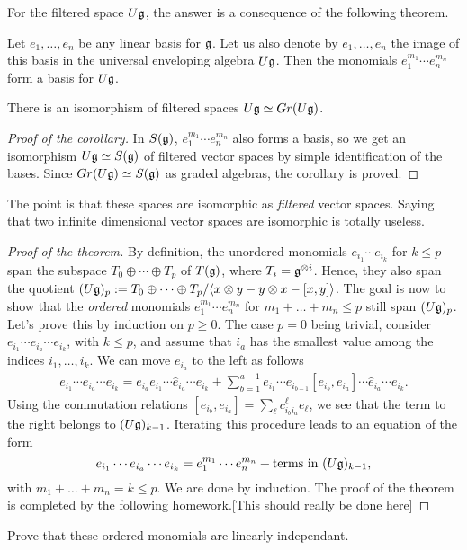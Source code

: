  For the filtered space $U\mathfrak{g}$, the answer is a consequence of the following theorem.
 \begin{theorem} 
   Let $e_1,\dots, e_n$ be any linear basis for $\mathfrak{g}$. Let us also denote by
   $e_1,\dots, e_n$ the image of this basis in the universal enveloping algebra $U\mathfrak{g}$.
   Then the monomials $e_1^{m_1}\cdots e_n^{m_n}$ form a basis for $U\mathfrak{g}$.
 \end{theorem}
 \begin{corollary}
 There is an isomorphism of filtered spaces $U\mathfrak{g}\simeq Gr(U\mathfrak{g})$.
 \end{corollary}
 \begin{proof}[Proof of the corollary]

In $S(\mathfrak{g})$, $e_1^{m_1}\cdots e_n^{m_n}$ also forms a basis, so we get an isomorphism
$U\mathfrak{g}\simeq S(\mathfrak{g})$ of filtered vector spaces by simple identification of the bases.
Since $Gr(U\mathfrak{g})\simeq S(\mathfrak{g})$ as graded algebras, the corollary is proved.
 \end{proof}
 \begin{remark}
 The point is that these spaces are isomorphic as {\em filtered} vector spaces. Saying
 that two infinite dimensional vector spaces are isomorphic is totally useless.
 \end{remark}
 \begin{proof}[Proof of the theorem]
  By definition, the unordered monomials $e_{i_1}\cdots e_{i_k}$ for $k\le p$ span the
  subspace $T_0\oplus \cdots \oplus T_p$ of $T(\mathfrak{g})$, where $T_i=\mathfrak{g}^{\otimes i}$. Hence,
  they also span the quotient $(U\mathfrak{g})_p := T_0\oplus \cdots \oplus T_p/\langle x\otimes
  y-y\otimes x -[x,y]\rangle$. The goal is now to show that the {\em ordered} monomials
  $e^{m_1}_1\cdots e^{m_n}_n$ for $m_1+\dots+m_n\le p$ still span $(U\mathfrak{g})_p$. Let's prove
  this by induction on $p\ge 0$. The case $p=0$ being trivial, consider $e_{i_1}\cdots
  e_{i_a}\cdots e_{i_k}$, with $k\le p$, and assume that $i_a$ has the smallest value
  among the indices $i_1,\dots, i_k$. We can move $e_{i_a}$ to the left as follows
  \begin{align*}
  e_{i_1}\cdots e_{i_a}\cdots e_{i_k}=e_{i_a}e_{i_1}\cdots \hat e_{i_a}\cdots e_{i_k}
  + \sum_{b=1}^{a-1} e_{i_1}\cdots e_{i_{b-1}} [e_{i_b},e_{i_a}]\cdots\hat
  e_{i_a}\cdots e_{i_k}.
  \end{align*}
  Using the commutation relations $[e_{i_b},e_{i_a}]=\sum_\ell c_{i_bi_a}^\ell
  e_\ell$, we see that the term to the right belongs to $(U\mathfrak{g})_{k-1}$. Iterating this
  procedure leads to an equation of the form
  \[
  e_{i_1}\cdots e_{i_a}\cdots e_{i_k}=e_1^{m_1}\cdots e_n^{m_n} + \hbox{terms in
    $(U\mathfrak{g})_{k-1}$,}
  \]
  with $m_1+\dots+m_n=k\le p$. We are done by induction. The proof of the theorem is
  completed by the following homework.[This should really be done here]
 \end{proof}
 \begin{exercise}
   Prove that these ordered monomials are linearly independant.
 \end{exercise}

